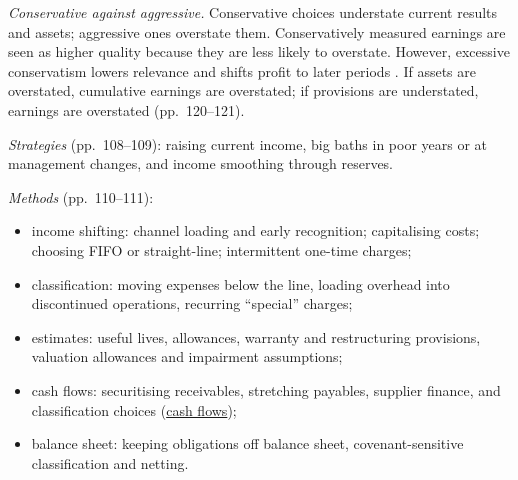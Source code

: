 \begin{qfmethod}\label{meth:earnings-management-presentation}
 \emph{Conservative against aggressive.} Conservative choices understate current results and assets; aggressive ones overstate them. Conservatively measured earnings are seen as higher quality because they are less likely to overstate. However, excessive conservatism lowers relevance and shifts profit to later periods \citep[p.~119]{financial-statement-analysis-2009}. If assets are overstated, cumulative earnings are overstated; if provisions are understated, earnings are overstated (pp.~120--121).

\emph{Strategies} (pp.~108--109): raising current income, big baths in poor years or at management changes, and income smoothing through reserves.

\emph{Methods} (pp.~110--111):
\begin{itemize}
\item income shifting: channel loading and early recognition; capitalising costs; choosing FIFO or straight-line; intermittent one-time charges;
\item classification: moving expenses below the line, loading overhead into discontinued operations, recurring ``special'' charges;
\item estimates: useful lives, allowances, warranty and restructuring provisions, valuation allowances and impairment assumptions;
\item cash flows: securitising receivables, stretching payables, supplier finance, and classification choices (\hyperref[meth:cash-flow-interpretation]{cash flows});
\item balance sheet: keeping obligations off balance sheet, covenant-sensitive classification and netting.
\end{itemize}


\end{qfmethod}
